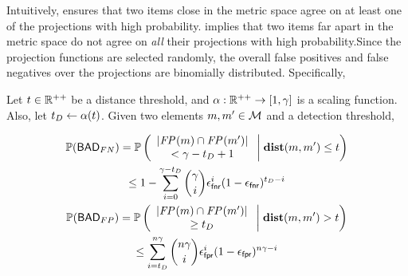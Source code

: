 Intuitively,  ensures that two items close in the metric space agree on at least one of the projections 
with high probability.  implies that two items far apart in the metric space do not agree on \emph{all} their projections with high probability.Since the projection functions are selected randomly, the overall false positives and false negatives over the projections are binomially distributed. Specifically, 


\def\scalingFn{\ensuremath{\alpha}\xspace}

\begin{corollary}
\label{corr:fingerprint_intersection}
Let $t \in \mathbb{R}^{++}$ be a distance threshold, and $\scalingFn: \reals^{++} \rightarrow  [1, \numProjections]$ is a scaling function. Also, let $\detectionThreshold \assign \scalingFn(\threshold)$. Given two elements $\genericMetricSpaceElmt, \genericMetricSpaceElmtAlt \in \metricSpace$ and a detection threshold, 

\begin{small}
\begin{gather*}
\prob{\badFN} = 
\cprob{}{\begin{array}{c} |\fingerprint{}(\genericMetricSpaceElmt) \cap \fingerprint{}(\genericMetricSpaceElmtAlt)|  \\ < \numProjections - \detectionThreshold + 1 \end{array}}{\distanceNotation[\distance][\genericMetricSpaceElmt][\genericMetricSpaceElmtAlt] \le \threshold} 
\\  \le 1 - \sum\limits_{i = 0}^{\numProjections - \detectionThreshold} \binom{\numProjections}{i} \fnr^{i} (1 - \fnr)^{\detectionThreshold - i} \\
\prob{\badFP} = \cprob{}{\begin{array}{c} |\fingerprint{}(\genericMetricSpaceElmt) \cap \fingerprint{}(\genericMetricSpaceElmtAlt)| \\ \ge  \detectionThreshold \end{array}}{\distanceNotation[\distance][\genericMetricSpaceElmt][\genericMetricSpaceElmtAlt] > \threshold} 
\\ \le \sum\limits_{i = \detectionThreshold}^{\blocklistSize \numProjections} \binom{\blocklistSize\numProjections}{i} \fpr^{i} (1 - \fpr)^{\blocklistSize \numProjections - i} \\
\end{gather*}
\end{small}
\end{corollary}

